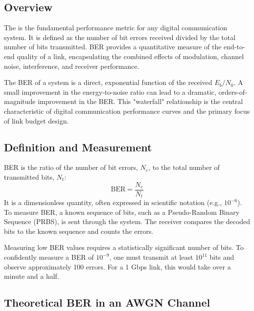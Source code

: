 \subsection{Overview}

The  is the fundamental performance metric for any digital communication system. It is defined as the number of bit errors received divided by the total number of bits transmitted. BER provides a quantitative measure of the end-to-end quality of a link, encapsulating the combined effects of modulation, channel noise, interference, and receiver performance.

\begin{keyconcept}
    The BER of a system is a direct, exponential function of the received $E_b/N_0$. A small improvement in the energy-to-noise ratio can lead to a dramatic, orders-of-magnitude improvement in the BER. This "waterfall" relationship is the central characteristic of digital communication performance curves and the primary focus of link budget design.
\end{keyconcept}


\subsection{Definition and Measurement}

BER is the ratio of the number of bit errors, $N_e$, to the total number of transmitted bits, $N_t$:
\begin{equation}
    \text{BER} = \frac{N_e}{N_t}
\end{equation}
It is a dimensionless quantity, often expressed in scientific notation (e.g., $10^{-6}$). To measure BER, a known sequence of bits, such as a Pseudo-Random Binary Sequence (PRBS), is sent through the system. The receiver compares the decoded bits to the known sequence and counts the errors.

\begin{warningbox}
    Measuring low BER values requires a statistically significant number of bits. To confidently measure a BER of $10^{-9}$, one must transmit at least $10^{11}$ bits and observe approximately 100 errors. For a 1 Gbps link, this would take over a minute and a half.
\end{warningbox}


\subsection{Theoretical BER in an AWGN Channel}

